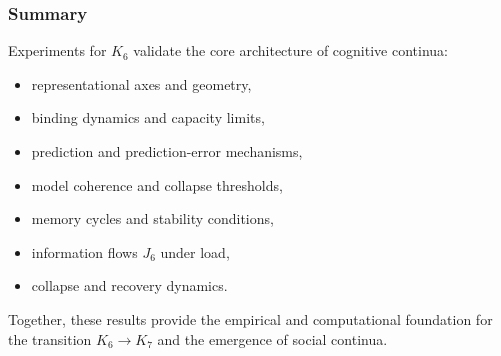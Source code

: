 \subsubsection{Summary}

Experiments for $K_6$ validate the core architecture of cognitive continua:

\begin{itemize}
    \item representational axes and geometry,
    \item binding dynamics and capacity limits,
    \item prediction and prediction-error mechanisms,
    \item model coherence and collapse thresholds,
    \item memory cycles and stability conditions,
    \item information flows $J_6$ under load,
    \item collapse and recovery dynamics.
\end{itemize}

Together, these results provide the empirical and computational
foundation for the transition $K_6 \rightarrow K_7$ and the
emergence of social continua.
